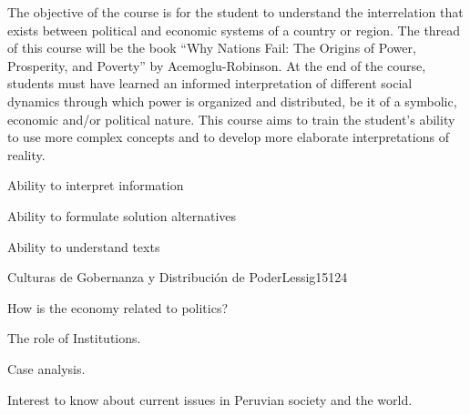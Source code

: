 \begin{syllabus}


\begin{justification}
The objective of the course is for the student to understand the interrelation that exists between political and economic systems of a country or region. The thread of this course will be the book “Why Nations Fail: The Origins of Power, Prosperity, and Poverty” by Acemoglu-Robinson.
At the end of the course, students must have learned an informed interpretation of different social dynamics through which power is organized and distributed, be it of a symbolic, economic and/or political nature. This course aims to train the student’s ability to use more complex concepts and to develop more elaborate interpretations of reality. 
\end{justification}

\begin{goals}
\item Ability to interpret information
\item Ability to formulate solution alternatives
\item Ability to understand texts 
\end{goals}

\begin{outcomes}
    \item {}
    \item {}
    \item {}
    
\end{outcomes}

\begin{competences}
    \item {}
    \item {}
    \item {}
    \item {}
\end{competences}

\begin{unit}{Culturas de Gobernanza y Distribución de Poder}{}{Lessig15}{12}{4}
   \begin{topics}
      \item How is the economy related to politics?
      \item The role of Institutions.
      \item Case analysis.
   \end{topics}
   \begin{learningoutcomes}
      \item Interest to know about current issues in Peruvian society and the world.
   \end{learningoutcomes}
\end{unit}


\begin{coursebibliography}
\end{coursebibliography}

\end{syllabus}
